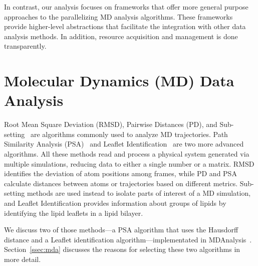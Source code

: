 In contrast, our analysis focuses on frameworks that offer more general 
purpose approaches to the parallelizing MD analysis algorithms.
These frameworks provide higher-level abstractions that facilitate the
integration with other data analysis methods. In addition, resource acquisition
and management is done transparently.

\section{Molecular Dynamics (MD) Data Analysis}
\label{sec:md_use_cases}

Root Mean Square Deviation (RMSD), Pairwise Distances (PD), and
Sub-setting~\cite{mura2014biomolecules} are algorithms commonly used to analyze
MD trajectories. Path Similarity Analysis (PSA)~\cite{seyler2015path} and
Leaflet Identification~\cite{michaud2011mdanalysis} are two more advanced
algorithms. All these methods read and process a physical system generated via
multiple simulations, reducing data to either a single number or a matrix. RMSD
identifies the deviation of atom positions among frames, while PD and PSA
calculate distances between atoms or trajectories based on different metrics.
Sub-setting methods are used instead to isolate parts of interest of a MD
simulation, and Leaflet Identification provides information about groups of
lipids by identifying the lipid leaflets in a lipid bilayer.

We discuss two of those methods---a PSA algorithm that uses the Hausdorff
distance and a Leaflet identification algorithm---implementated in
MDAnalysis~\cite{michaud2011mdanalysis,gowers2016mdanalysis}.
Section~\ref{ssec:mda} discusses the reasons for selecting these two algorithms
in more detail.



